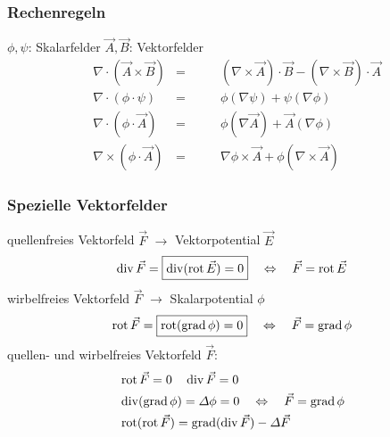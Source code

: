 	\subsubsection{Rechenregeln}
		$\phi, \psi$: Skalarfelder \qquad $\vec{A}, \vec{B}$: Vektorfelder
		\begin{align*}
			& \nabla \cdot (\vec{A} \times \vec{B}) & = & \qquad (\nabla \times \vec{A})\cdot\vec{B} - (\nabla\times\vec{B})\cdot\vec{A} \\
			& \nabla \cdot (\phi \cdot \psi)        & = & \qquad \phi (\nabla \psi) + \psi( \nabla \phi)                                 \\
			& \nabla \cdot (\phi \cdot \vec{A})     & = & \qquad \phi (\nabla \vec{A}) + \vec{A}(\nabla \phi)                            \\
			& \nabla \times (\phi \cdot \vec{A})    & = & \qquad \nabla \phi \times \vec{A} + \phi (\nabla \times \vec{A})
		\end{align*}

	\subsubsection{Spezielle Vektorfelder}
		quellenfreies Vektorfeld $\vec{F}$ $\rightarrow$ Vektorpotential $\vec{E}$
		\begin{align*}
			\operatorname{div} \vec{F} = \boxed{\operatorname{div} (\operatorname{rot} \vec{E}) = 0} \quad \Leftrightarrow \quad  \vec{F} = \operatorname{rot} \vec{E}
		\end{align*}
		wirbelfreies Vektorfeld $\vec{F}$ $\rightarrow$ Skalarpotential $\phi$
		\begin{align*}
			\operatorname{rot} \vec{F} = \boxed{\operatorname{rot} (\operatorname{grad} \phi) = 0} \quad \Leftrightarrow \quad  \vec{F} = \operatorname{grad} \phi
		\end{align*}
		quellen- und wirbelfreies Vektorfeld $\vec{F}$:
		\begin{align*}
			& \operatorname{rot} \vec{F}  = 0 \quad \operatorname{div} \vec{F} = 0                                                   \\
			& \operatorname{div} (\operatorname{grad} \phi) = \varDelta \phi = 0 \quad \Leftrightarrow \quad  \vec{F} = \operatorname{grad} \phi \\
			& \operatorname{rot} (\operatorname{rot} \vec{F})  = \operatorname{grad} (\operatorname{div} \vec{F}) - \varDelta \vec{F}
		\end{align*}


